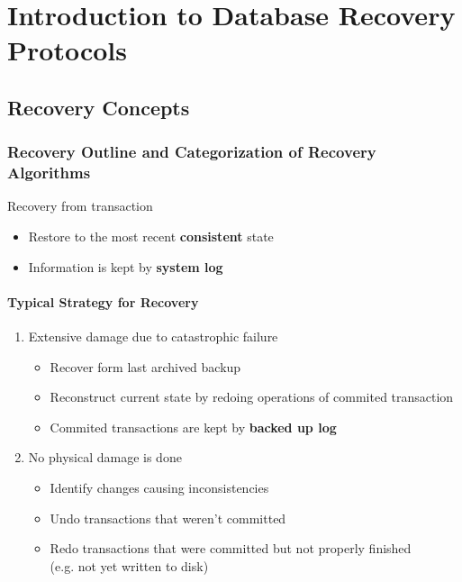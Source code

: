\chapter{Introduction to Database Recovery Protocols}
\section{Recovery Concepts}
\subsection{Recovery Outline and Categorization of Recovery Algorithms}
Recovery from transaction 
\begin{itemize}
	\item Restore to the most recent \textbf{consistent} state
	\item Information is kept by \textbf{system log}
\end{itemize}
\subsubsection{Typical Strategy for Recovery}
\begin{enumerate}
	\item Extensive damage due to catastrophic failure
	\begin{itemize}
		\item Recover form last archived backup
		\item Reconstruct current state  by redoing operations of commited transaction
		\item Commited transactions are kept by \textbf{backed up log}
	\end{itemize}
	\item No physical damage is done
	\begin{itemize}
		\item Identify changes causing inconsistencies
		\item Undo transactions that weren't committed
		\item Redo transactions that were committed but not properly finished 
		\\	  (e.g. not yet written to disk)
	\end{itemize}
\end{enumerate}

